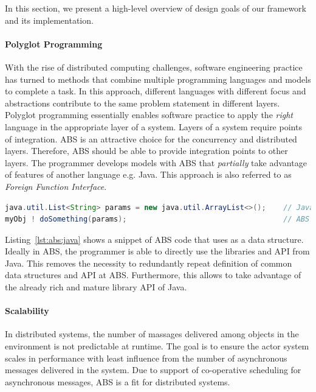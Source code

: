 In this section, we present a high-level overview of design goals of our framework and its implementation. 

\paragraph{Polyglot Programming}
With the rise of distributed computing challenges, software engineering practice has turned to methods that combine multiple programming languages and models to complete a task. 
In this approach, different languages with different focus and abstractions contribute to the same problem statement in different layers. 
Polyglot programming essentially enables software practice to apply the \emph{right} language in the appropriate layer of a system.
Layers of a system require points of integration.
ABS is an attractive choice for the concurrency and distributed layers.
Therefore, ABS should be able to provide integration points to other layers.
The programmer develops models with ABS that \emph{partially} take advantage of features of another language e.g. Java.
This approach is also referred to as \emph{Foreign Function Interface}.

\begin{lstlisting}[float=h,language=Java,caption=Using Java in ABS,label=lst:abs:java]
java.util.List<String> params = new java.util.ArrayList<>();    // Java
myObj ! doSomething(params);                                    // ABS
\end{lstlisting}

Listing~\ref{lst:abs:java} shows a snippet of ABS code that uses  as a data structure.
Ideally in ABS, the programmer is able to directly use the libraries and API from Java.
This removes the necessity to redundantly repeat definition of common data structures and API at ABS.
Furthermore, this allows to take advantage of the already rich and mature library API of Java.

\paragraph{Scalability} 
In distributed systems, the number of massages delivered among objects in the 
environment is not predictable at runtime.
The goal is to ensure the actor system scales in performance with least 
influence from the number of asynchronous messages delivered in the system.
Due to support of co-operative scheduling for asynchronous messages, ABS is a fit for distributed systems.

